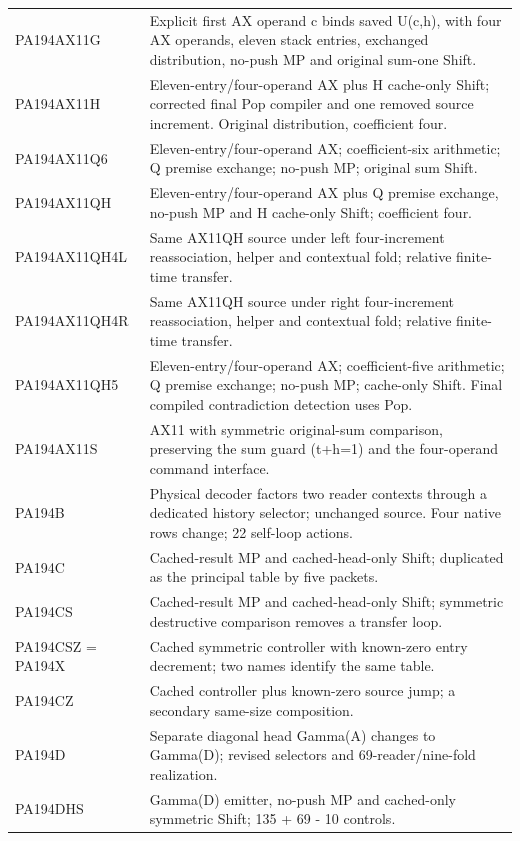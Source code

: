 \begin{longtable}{p{}p{}}
PA194AX11G & Explicit first AX operand c binds saved U(c,h), with four AX operands, eleven stack entries, exchanged distribution, no-push MP and original sum-one Shift. \\
PA194AX11H & Eleven-entry/four-operand AX plus H cache-only Shift; corrected final Pop compiler and one removed source increment. Original distribution, coefficient four. \\
PA194AX11Q6 & Eleven-entry/four-operand AX; coefficient-six arithmetic; Q premise exchange; no-push MP; original sum Shift. \\
PA194AX11QH & Eleven-entry/four-operand AX plus Q premise exchange, no-push MP and H cache-only Shift; coefficient four. \\
PA194AX11QH4L & Same AX11QH source under left four-increment reassociation, helper and contextual fold; relative finite-time transfer. \\
PA194AX11QH4R & Same AX11QH source under right four-increment reassociation, helper and contextual fold; relative finite-time transfer. \\
PA194AX11QH5 & Eleven-entry/four-operand AX; coefficient-five arithmetic; Q premise exchange; no-push MP; cache-only Shift. Final compiled contradiction detection uses Pop. \\
PA194AX11S & AX11 with symmetric original-sum comparison, preserving the sum guard (t+h=1) and the four-operand command interface. \\
PA194B & Physical decoder factors two reader contexts through a dedicated history selector; unchanged source. Four native rows change; 22 self-loop actions. \\
PA194C & Cached-result MP and cached-head-only Shift; duplicated as the principal table by five packets. \\
PA194CS & Cached-result MP and cached-head-only Shift; symmetric destructive comparison removes a transfer loop. \\
PA194CSZ = PA194X & Cached symmetric controller with known-zero entry decrement; two names identify the same table. \\
PA194CZ & Cached controller plus known-zero source jump; a secondary same-size composition. \\
PA194D & Separate diagonal head Gamma(A) changes to Gamma(D); revised selectors and 69-reader/nine-fold realization. \\
PA194DHS & Gamma(D) emitter, no-push MP and cached-only symmetric Shift; 135 + 69 - 10 controls. \\

\end{longtable}
